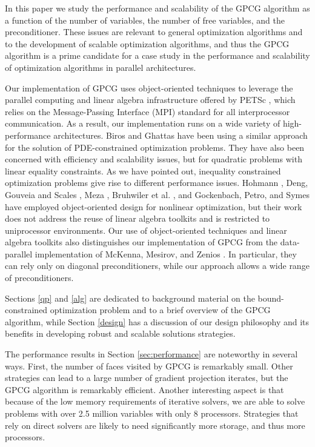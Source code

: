 In this paper we study the performance and scalability
of the GPCG algorithm as a function of the 
number of variables, the number of free variables, and the preconditioner.
These issues are relevant to general optimization algorithms and
to the development of scalable optimization algorithms, and thus
the GPCG algorithm is a prime candidate for a case study
in the performance and scalability of optimization algorithms
in parallel architectures.

Our implementation of GPCG uses object-oriented techniques
to leverage the parallel
computing and linear algebra infrastructure offered by PETSc
\cite{petsc,PETSc-user-ref}, which relies on the Message-Passing 
Interface (MPI) \cite{using-mpi} standard for all
interprocessor communication.  
As a result, our implementation runs on a wide variety of
high-performance architectures.
Biros and Ghattas \cite{GB99b,GB99a} have been using
a similar approach for the solution of PDE-constrained optimization problems.
They have also been concerned with efficiency and scalability
issues, but for quadratic problems with linear equality constraints.
As we have pointed out, inequality constrained optimization
problems give rise to different performance issues.
Hohmann \cite{hohmann:94}, 
Deng, Gouveia and Scales \cite{HLD94},
Meza \cite{meza:94},
Bruhwiler et al. \cite{bsca98}, and Gockenbach, Petro, and Symes
\cite{Gockenbach:1999:CCL}
have employed object-oriented design
for nonlinear optimization, but their work
does not address the reuse of linear algebra toolkits and
is restricted to uniprocessor environments.
Our use of object-oriented techniques and linear algebra
toolkits also distinguishes our implementation of GPCG from
the data-parallel implementation of McKenna, Mesirov, and
Zenios \cite{MOM95}. In particular, they can rely only
on diagonal preconditioners, while our approach allows a wide
range of preconditioners.

Sections \ref{qp} and \ref{alg} are dedicated to
background material on the bound-constrained 
optimization problem  and to
a brief overview of the GPCG algorithm, while
Section \ref{design} has a discussion
of our design philosophy and its benefits in
developing robust and scalable solutions strategies.

The performance results
in Section \ref{sec:performance} are noteworthy in several ways.
First, the number of faces visited by GPCG is remarkably small.
Other strategies can lead to a large number of gradient projection
iterates, but the GPCG algorithm is remarkably efficient.
Another interesting aspect is that because of the
low memory requirements of iterative solvers, we are able
to solve problems with over 2.5 million variables
with only $ 8 $ processors.
Strategies that rely on direct solvers are likely to need
significantly more storage, and thus more processors.

